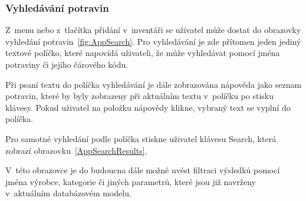 \documentclass[thesis=B,czech]{FITthesis}[2013/10/20]
\begin{document}
\clearpage

\subsubsection{Vyhledávání potravin}

Z~menu nebo z~tlačítka přidání v~inventáři se uživatel může dostat do obrazovky vyhledání potravin~\ref{fig:AppSearch}. Pro vyhledávání je zde přítomen jeden jediný textové políčko, které napovídá uživateli, že může vyhledávat pomocí jména potraviny či jejího čárového kódu.

Při psaní textu do políčka vyhledávání je dále zobrazována nápověda jako seznam potravin, které by byly zobrazeny při aktuálním textu v~políčku po stisku klávesy. Pokud uživatel na položku nápovědy klikne, vybraný text se vyplní do políčka.

Pro samotné vyhledání podle políčka stiskne uživatel klávesu Search, která zobrazí obrazovku~\ref{AppSearchResults}.

V~této obrazovce je do budoucna dále možné uvést filtraci výsledků pomocí jména výrobce, kategorie či jiných parametrů, které jsou již navrženy v~aktuálním databázovém modelu.
\end{document}
